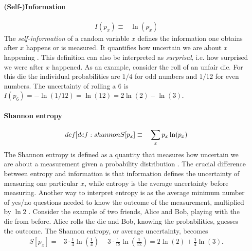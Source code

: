 \documentclass{book}
\numberwithin{equation}{section} %
\begin{document}
\paragraph{(Self-)Information}
\begin{align}
    I(p_x) \equiv -\ln(p_x)
\end{align}
The \emph{self-information} of a random variable $x$ defines the information one obtains after $x$ happens or is measured.
It quantifies how uncertain we are about $x$ happening \cite{BA_shannon}.
This definition can also be interpreted as \emph{surprisal}, i.e. how surprised we were after $x$ happened.
As an example, consider the roll of an unfair die. For this die the individual probabilities are $1/4$ for odd numbers and $1/12$ for even numbers.
The uncertainty of rolling a $6$ is $I(p_6) = -\ln(1/12) = \ln(12) = 2\ln(2) + \ln(3)$.
\paragraph{Shannon entropy}
\begin{align}\label[def]{def:shannon}
    S[p_x] \equiv - \sum\limits_x p_x \ln(p_x)
\end{align}
The Shannon entropy is defined as a quantity that measures how uncertain we are about a
measurement given a probability distribution \cite{BA_shannon}.
The crucial difference between entropy and information is that information defines the uncertainty
of measuring one particular $x$, while entropy is the average uncertainty before measuring.
Another way to interpret entropy is as the average minimum number of yes/no questions needed to know the outcome of the measurement,
multiplied by $\ln2$ \cite{HS_BA_SeifertSkript}.
Consider the example of two friends, Alice and Bob, playing with the die from before. Alice rolls the die and Bob, knowing the probabilities,
guesses the outcome.
The Shannon entropy, or average uncertainty, becomes
\begin{align}\label{eq:shannon-example}
    S[p_x] = - 3\cdot\frac{1}{4}\ln(\frac{1}{4}) - 3 \cdot\frac{1}{12}\ln(\frac{1}{12}) = 2\ln(2) + \frac{1}{4}\ln(3).
\end{align}

\end{document}
